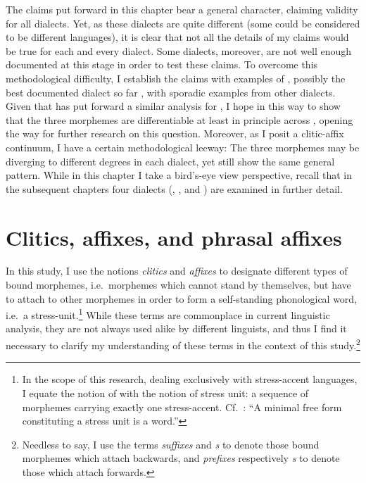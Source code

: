 \largerpage
The claims put forward in this chapter bear a general character, claiming validity for all  dialects. Yet, as these dialects are quite different (some could be considered to be different languages), it is clear that not all the details of my claims would be true for each and every dialect. Some dialects, moreover, are  not well enough documented at this stage in order to test these claims. To overcome this methodological difficulty, I establish the claims with examples of \Barw, possibly the best documented dialect so far \citep{KhanBarwar}, with sporadic examples from other dialects. Given that \citet{CohenNucleus} has put forward a similar analysis for \JZax, I hope in this way to show that the three morphemes are differentiable at least in principle across , opening the way for further research on this question.  Moreover, as I posit a clitic-affix continuum, I have a certain methodological leeway: The three morphemes may be diverging to different degrees in each dialect, yet still show the same general pattern. While in this chapter I take a bird's-eye view perspective, recall that in the subsequent chapters four dialects (\JZax, \Qar, \JSan  and \JUrm) are examined in further detail.

\section{Clitics, affixes, and phrasal affixes} \label{ss:clitics_affixes}

In this study, I use the notions \emph{clitics} and \emph{affixes} to designate different types of bound morphemes,  i.e.\ morphemes which cannot stand by themselves, but have to attach to other morphemes in order to form a self-standing phonological word, i.e.\ a stress-unit.\footnote{In the scope of this research, dealing exclusively with stress-accent languages, I equate the notion of  with the notion of stress unit: a sequence of morphemes carrying exactly one stress-accent. Cf.\ \citet[39]{GarbellUrmi}: \enquote{A minimal free form constituting a stress unit is a word.}} While these terms  are commonplace in current linguistic analysis, they are not always used alike  by different linguists, and thus I find it necessary to clarify my understanding of these terms in the context of this study.\footnote{Needless to say, I use the terms \emph{suffixes} and \emph{s} to denote those bound morphemes which attach backwards, and \emph{prefixes} respectively \emph{s} to denote those which attach forwards.} 

